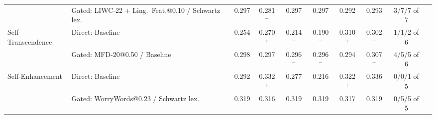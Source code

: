\begin{table}[!htbp]
\begin{tabularx}{\textwidth}{lXcccccccc}
 & Gated: LIWC-22 + Ling.\ Feat.@0.10 / Schwartz lex. & 0.297 & 0.281$^{-}$ & 0.297 & 0.297 & 0.292 & 0.293 & 3/7/7 of 7 \\
Self-Transcendence & Direct: Baseline & 0.254 & 0.270$^{+}$ & 0.214$^{-}$ & 0.190$^{-}$ & 0.310$^{+}$ & 0.302$^{+}$ & 1/1/2 of 6 \\
 & Gated: MFD-20@0.50 / Baseline & 0.298 & 0.297 & 0.296$^{-}$ & 0.296$^{-}$ & 0.294 & 0.307$^{+}$ & 4/5/5 of 6 \\
Self-Enhancement & Direct: Baseline & 0.292 & 0.332$^{+}$ & 0.277$^{-}$ & 0.216$^{-}$ & 0.322$^{+}$ & 0.336$^{+}$ & 0/0/1 of 5 \\
 & Gated: WorryWords@0.23 / Schwartz lex. & 0.319 & 0.316 & 0.319 & 0.319 & 0.317 & 0.319 & 0/5/5 of 5 \\
\hline
\end{tabularx}
\end{table}

